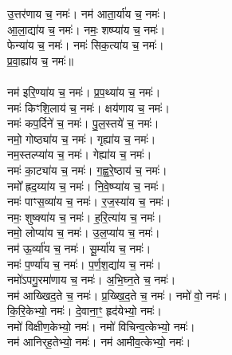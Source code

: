 उ॒त्तर॑णाय च॒ नमः॑। नम॑ आता॒र्या॑य च॒ नमः॑।\\
आ॒ला॒द्या॑य च॒ नमः॑। नमः॒ शष्प्या॑य च॒ नमः॑।\\
फेन्या॑य च॒ नमः॑। नमः॑ सिक॒त्या॑य च॒ नमः॑।\\
प्र॒वा॒ह्या॑य च॒ नमः॑॥\\
\\
नम॑ इरि॒ण्या॑य च॒ नमः॑। प्र॒प॒थ्या॑य च॒ नमः॑।\\
नमः॑ किꣳशि॒लाय॑ च॒ नमः॑। क्षय॑णाय च॒ नमः॑।\\
नमः॑ कप॒र्दिने॑ च॒ नमः॑। पु॒ल॒स्तये॑ च॒ नमः॑।\\
नमो॒ गोष्ठ्या॑य च॒ नमः॑। गृह्या॑य च॒ नमः॑।\\
नम॒स्तल्प्या॑य च॒ नमः॑। गेह्या॑य च॒ नमः॑।\\
नमः॑ का॒ट्या॑य च॒ नमः॑। ग॒ह्व॒रे॒ष्ठाय॑ च॒ नमः॑।\\
नमो᳚ ह्रद॒य्या॑य च॒ नमः॑। नि॒वे॒ष्प्या॑य च॒ नमः॑।\\
नमः॑ पाꣳस॒व्या॑य च॒ नमः॑। र॒ज॒स्या॑य च॒ नमः॑।\\
नमः॒ शुष्क्या॑य च॒ नमः॑। ह॒रि॒त्या॑य च॒ नमः॑।\\
नमो॒ लोप्या॑य च॒ नमः॑। उ॒ल॒प्या॑य च॒ नमः॑।\\
नम॑ ऊ॒र्व्या॑य च॒ नमः॑। सू॒र्म्या॑य च॒ नमः॑।\\
नमः॑ प॒र्ण्या॑य च॒ नमः॑। प॒र्ण॒श॒द्या॑य च॒ नमः॑।\\
नमो॑ऽपगु॒रमा॑णाय च॒ नमः॑। अ॒भि॒घ्न॒ते च॒ नमः॑।\\
नम॑ आख्खिद॒ते च॒ नमः॑। प्र॒ख्खि॒द॒ते च॒ नमः॑। नमो॑ वो॒ नमः॑।\\
कि॒रि॒केभ्यो॒ नमः॑। दे॒वाना॒ꣳ॒ हृद॑येभ्यो॒ नमः॑।\\
नमो॑ विक्षीण॒केभ्यो॒ नमः॑। नमो॑ विचिन्व॒त्केभ्यो॒ नमः॑।\\
नम॑ आनिर्‌ह॒तेभ्यो॒ नमः॑। नम॑ आमीव॒त्केभ्यो॒ नमः॑।\\
{\small\closesection}


